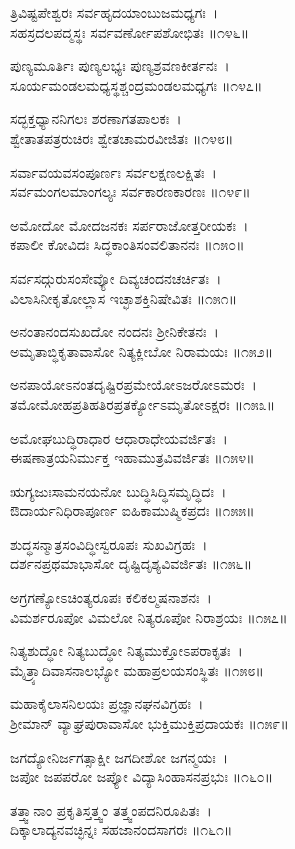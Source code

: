 	ತ್ರಿವಿಷ್ಟಪೇಶ್ವರಃ ಸರ್ವಹೃದಯಾಂಬುಜಮಧ್ಯಗಃ~।\\
	ಸಹಸ್ರದಲಪದ್ಮಸ್ಥಃ ಸರ್ವವರ್ಣೋಪಶೋಭಿತಃ ॥೧೪೬॥

ಪುಣ್ಯಮೂರ್ತಿಃ ಪುಣ್ಯಲಭ್ಯಃ ಪುಣ್ಯಶ್ರವಣಕೀರ್ತನಃ~।\\
ಸೂರ್ಯಮಂಡಲಮಧ್ಯಸ್ಥಶ್ಚಂದ್ರಮಂಡಲಮಧ್ಯಗಃ ॥೧೪೭॥

	ಸದ್ಭಕ್ತಧ್ಯಾನನಿಗಲಃ ಶರಣಾಗತಪಾಲಕಃ~।\\
	ಶ್ವೇತಾತಪತ್ರರುಚಿರಃ ಶ್ವೇತಚಾಮರವೀಜಿತಃ ॥೧೪೮॥

ಸರ್ವಾವಯವಸಂಪೂರ್ಣಃ ಸರ್ವಲಕ್ಷಣಲಕ್ಷಿತಃ~।\\
ಸರ್ವಮಂಗಲಮಾಂಗಲ್ಯಃ ಸರ್ವಕಾರಣಕಾರಣಃ ॥೧೪೯॥

	ಅಮೋದೋ ಮೋದಜನಕಃ ಸರ್ಪರಾಜೋತ್ತರೀಯಕಃ~।\\
	ಕಪಾಲೀ ಕೋವಿದಃ ಸಿದ್ಧಕಾಂತಿಸಂವಲಿತಾನನಃ ॥೧೫೦॥

ಸರ್ವಸದ್ಗುರುಸಂಸೇವ್ಯೋ ದಿವ್ಯಚಂದನಚರ್ಚಿತಃ~।\\
ವಿಲಾಸಿನೀಕೃತೋಲ್ಲಾಸ ಇಚ್ಛಾಶಕ್ತಿನಿಷೇವಿತಃ ॥೧೫೧॥

	ಅನಂತಾನಂದಸುಖದೋ ನಂದನಃ ಶ್ರೀನಿಕೇತನಃ~।\\
	ಅಮೃತಾಬ್ಧಿಕೃತಾವಾಸೋ ನಿತ್ಯಕ್ಲೀಬೋ ನಿರಾಮಯಃ ॥೧೫೨॥

ಅನಪಾಯೋಽನಂತದೃಷ್ಟಿರಪ್ರಮೇಯೋಽಜರೋಽಮರಃ~।\\
ತಮೋಮೋಹಪ್ರತಿಹತಿರಪ್ರತರ್ಕ್ಯೋಽಮೃತೋಽಕ್ಷರಃ ॥೧೫೩॥

	ಅಮೋಘಬುದ್ಧಿರಾಧಾರ ಆಧಾರಾಧೇಯವರ್ಜಿತಃ~।\\
	ಈಷಣಾತ್ರಯನಿರ್ಮುಕ್ತ ಇಹಾಮುತ್ರವಿವರ್ಜಿತಃ ॥೧೫೪॥

ಋಗ್ಯಜುಃಸಾಮನಯನೋ ಬುದ್ಧಿಸಿದ್ಧಿಸಮೃದ್ಧಿದಃ~।\\
ಔದಾರ್ಯನಿಧಿರಾಪೂರ್ಣ ಐಹಿಕಾಮುಷ್ಮಿಕಪ್ರದಃ ॥೧೫೫॥

	ಶುದ್ಧಸನ್ಮಾತ್ರಸಂವಿದ್ಧೀಸ್ವರೂಪಃ ಸುಖವಿಗ್ರಹಃ~।\\
	ದರ್ಶನಪ್ರಥಮಾಭಾಸೋ ದೃಷ್ಟಿದೃಶ್ಯವಿವರ್ಜಿತಃ ॥೧೫೬॥

ಅಗ್ರಗಣ್ಯೋಽಚಿಂತ್ಯರೂಪಃ ಕಲಿಕಲ್ಮಷನಾಶನಃ~।\\
ವಿಮರ್ಶರೂಪೋ ವಿಮಲೋ ನಿತ್ಯರೂಪೋ ನಿರಾಶ್ರಯಃ ॥೧೫೭॥

ನಿತ್ಯಶುದ್ಧೋ ನಿತ್ಯಬುದ್ಧೋ ನಿತ್ಯಮುಕ್ತೋಽಪರಾಕೃತಃ~।\\
ಮೈತ್ರ್ಯಾದಿವಾಸನಾಲಭ್ಯೋ ಮಹಾಪ್ರಲಯಸಂಸ್ಥಿತಃ ॥೧೫೮॥

ಮಹಾಕೈಲಾಸನಿಲಯಃ ಪ್ರಜ್ಞಾನಘನವಿಗ್ರಹಃ~।\\
ಶ್ರೀಮಾನ್ ವ್ಯಾಘ್ರಪುರಾವಾಸೋ ಭುಕ್ತಿಮುಕ್ತಿಪ್ರದಾಯಕಃ ॥೧೫೯॥

	ಜಗದ್ಯೋನಿರ್ಜಗತ್ಸಾಕ್ಷೀ ಜಗದೀಶೋ ಜಗನ್ಮಯಃ~।\\
	ಜಪೋ ಜಪಪರೋ ಜಪ್ಯೋ ವಿದ್ಯಾಸಿಂಹಾಸನಪ್ರಭುಃ ॥೧೬೦॥

ತತ್ತ್ವಾನಾಂ ಪ್ರಕೃತಿಸ್ತತ್ತ್ವಂ ತತ್ತ್ವಂಪದನಿರೂಪಿತಃ~।\\
ದಿಕ್ಕಾಲಾದ್ಯನವಚ್ಛಿನ್ನಃ ಸಹಜಾನಂದಸಾಗರಃ ॥೧೬೧॥

